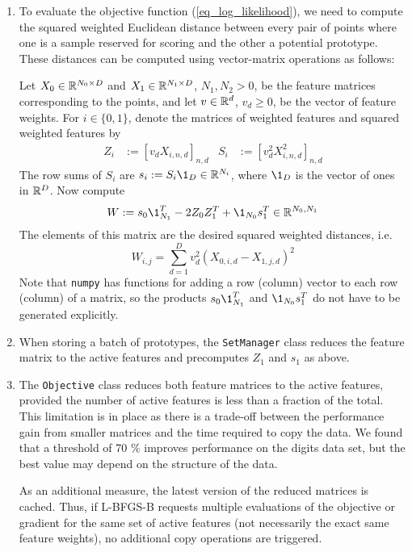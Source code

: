 \begin{enumerate}
\item To evaluate the objective function (\ref{eq_log_likelihood}), we need to compute the squared weighted Euclidean distance between every pair of points where one is a sample reserved for scoring and the other a potential prototype.
These distances can be computed using vector-matrix operations as follows:\par
%
Let $X_0\in\mathbb{R}^{N_0\times D}$ and $X_1\in\mathbb{R}^{N_1\times D}$, $N_1,N_2>0$, be the feature matrices corresponding to the points, and let $v\in\mathbb{R}^d$, $v_d\geq0$, be the vector of feature weights.
For $i\in\{0,1\}$, denote the matrices of weighted features and squared weighted features by
%
\begin{align}
Z_i&:=[v_dX_{i,n,d}]_{n,d}&S_i&:=[v_d^2X_{i,n,d}^2]_{n,d}\label{eq_ZiSi}
\end{align}
%
The row sums of $S_i$ are $s_i:=S_i\1_D\in\R^{N_i}$, where $\1_D$ is the vector of ones in $\mathbb{R}^D$.
Now compute
%
\begin{equation}
W:=s_0\1_{N_1}^T-2Z_0Z_1^T+\1_{N_0}s_1^T\in\R^{N_0,N_1}\label{eq_W}
\end{equation}
%
The elements of this matrix are the desired squared weighted distances, i.e.\
%
\begin{equation}
W_{i,j}=\sum_{d=1}^Dv_d^2(X_{0,i,d}-X_{1,j,d})^2\label{eq_Wij}
\end{equation}
%
Note that \texttt{numpy} has functions for adding a row (column) vector to each row (column) of a matrix, so the products $s_0\1_{N_1}^T$ and $\1_{N_0}s_1^T$ do not have to be generated explicitly.
%
\item When storing a batch of prototypes, the \texttt{SetManager} class reduces the feature matrix to the active features and precomputes $Z_1$ and $s_1$ as above.
%
\item The \texttt{Objective} class reduces both feature matrices to the active features, provided the number of active features is less than a fraction of the total.
This limitation is in place as there is a trade-off between the performance gain from smaller matrices and the time required to copy the data.
We found that a threshold of 70 \% improves performance on the digits data set, but the best value may depend on the structure of the data.\par
%
As an additional measure, the latest version of the reduced matrices is cached.
Thus, if L-BFGS-B requests multiple evaluations of the objective or gradient for the same set of active features (not necessarily the exact same feature weights), no additional copy operations are triggered.
\end{enumerate}
%
\endinput
